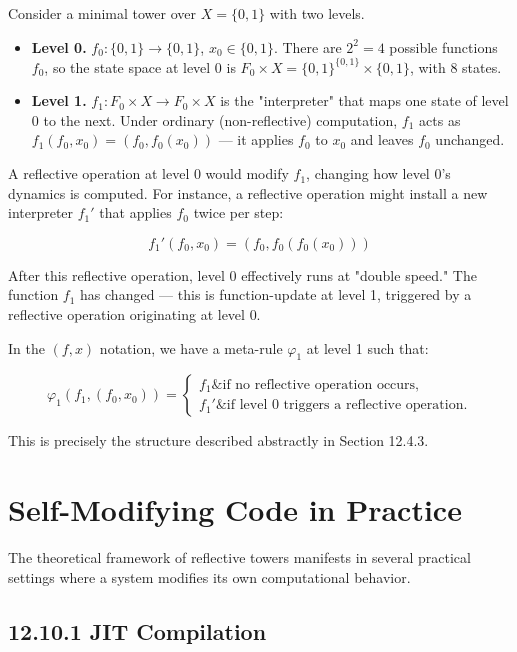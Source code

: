 Consider a minimal tower over $X = \{ 0, 1\} $ with two levels.

\begin{itemize}
\item \textbf{Level 0.} $f_0: \{ 0, 1\}  \to \{ 0, 1\} $, $x_0 \in \{ 0, 1\} $. There are $2^2 = 4$ possible functions $f_0$, so the state space at level 0 is $F_0 \times X = \{ 0,1\} ^{\{ 0,1\} } \times \{ 0,1\} $, with 8 states.
\end{itemize}

\begin{itemize}
\item \textbf{Level 1.} $f_1: F_0 \times X \to F_0 \times X$ is the "interpreter" that maps one state of level 0 to the next. Under ordinary (non-reflective) computation, $f_1$ acts as $f_1(f_0, x_0) = (f_0, f_0(x_0))$ --- it applies $f_0$ to $x_0$ and leaves $f_0$ unchanged.
\end{itemize}

A reflective operation at level 0 would modify $f_1$, changing how level 0's dynamics is computed. For instance, a reflective operation might install a new interpreter $f_1'$ that applies $f_0$ twice per step:

\[f_1'(f_0, x_0) = (f_0, f_0(f_0(x_0)))\]

After this reflective operation, level 0 effectively runs at "double speed." The function $f_1$ has changed --- this is function-update at level 1, triggered by a reflective operation originating at level 0.

In the $(f, x)$ notation, we have a meta-rule $\varphi_1$ at level 1 such that:

\[\varphi_1(f_1, (f_0, x_0)) = \begin{cases} f_1 \& \text{if no reflective operation occurs,} \\ f_1' \& \text{if level 0 triggers a reflective operation.} \end{cases}\]

This is precisely the structure described abstractly in Section 12.4.3.

\section{Self-Modifying Code in Practice}

The theoretical framework of reflective towers manifests in several practical settings where a system modifies its own computational behavior.

\subsection{12.10.1 JIT Compilation}

